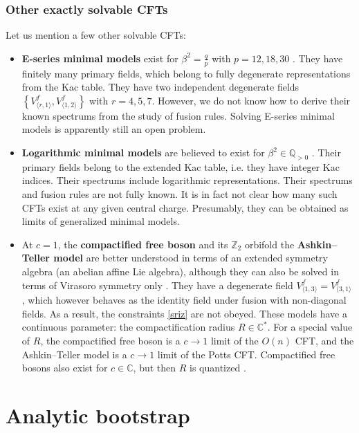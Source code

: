 \documentclass[12pt, a4paper]{article}
\newcommand{\myindex}[1]{\textbf{\boldmath #1}}
\theoremstyle{break}
\begin{document}
\subsubsection{Other exactly solvable CFTs}

Let us mention a few other solvable CFTs:
\begin{itemize}
 \item \myindex{E-series minimal models} exist for $\beta^2=\frac{q}{p}$ with $p=12, 18, 30$ \cite{fms97}. They have finitely many primary fields, which belong to fully degenerate representations from the Kac table. 
They have two independent degenerate fields $\left\{V^f_{\langle r,1\rangle},V^f_{\langle 1,2\rangle}\right\}$ with $r=4,5,7$. 
However, we do not know how to derive their known spectrums from the study of fusion rules. 
Solving E-series minimal models is apparently still an open problem. 
\item \myindex{Logarithmic minimal models} are believed to exist for $\beta^2\in \mathbb{Q}_{>0}$ \cite{prz06}. Their primary fields belong to the extended Kac table, i.e. they have integer Kac indices. Their spectrums include logarithmic representations. Their spectrums and fusion rules are not fully known. It is in fact not clear how many such CFTs exist at any given central charge. Presumably, they can be obtained as limits of generalized minimal models. 
\item At $c=1$, the \myindex{compactified free boson} and its $\mathbb{Z}_2$ orbifold the \myindex{Ashkin--Teller model} are better understood in terms of an extended symmetry algebra (an abelian affine Lie algebra), although they can also be solved in terms of Virasoro symmetry only \cite{nr21}. They have a degenerate field $V^f_{\langle 1, 3\rangle}=V^f_{\langle 3,1\rangle}$, which however behaves as the identity field under fusion with non-diagonal fields. As a result, the constraints \eqref{sriz} are not obeyed. These models have a continuous parameter: the compactification radius $R\in\mathbb{C}^*$. For a special value of $R$, the compactified free boson is a $c\to 1$ limit of the $O(n)$ CFT, and the Ashkin--Teller model is a $c\to 1$ limit of the Potts CFT. Compactified free bosons also exist for $c\in\mathbb{C}$, but then $R$ is quantized \cite{rib14}. 
\end{itemize}


\section{Analytic bootstrap}\label{sec:ab}
\end{document}
